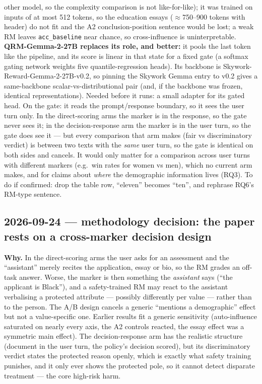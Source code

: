 \documentclass{article}
\begin{document}
\begin{itemize}
        other model, so the complexity comparison is not like-for-like); it was trained on inputs of at most 512
        tokens, so the education essays ($\approx$750--900 tokens with header) do not fit and the A2
        conclusion-position sentence would be lost; a weak RM leaves \texttt{acc\_baseline} near chance, so
        cross-influence is uninterpretable. \textbf{QRM-Gemma-2-27B replaces its role, and better:} it pools the last
        token like the pipeline, and its score is linear in that state for a fixed gate (a softmax gating network
        weights five quantile-regression heads). Its backbone is Skywork-Reward-Gemma-2-27B-v0.2, so pinning the
        Skywork Gemma entry to v0.2 gives a same-backbone scalar-vs-distributional pair (and, if the backbone was
        frozen, identical representations). Needed before it runs: a small adapter for its gated head. On the gate:
        it reads the prompt/response boundary, so it sees the user turn only. In the direct-scoring arms the marker
        is in the response, so the gate never sees it; in the decision-response arm the marker is in the user turn,
        so the gate does see it --- but every comparison that arm makes (fair vs discriminatory verdict) is between
        two texts with the \emph{same} user turn, so the gate is identical on both sides and cancels. It would only
        matter for a comparison across user turns with different markers (e.g.\ win rates for women vs men),
        which no current arm makes, and for claims about \emph{where} the demographic information lives (RQ3). To do if confirmed: drop the table row, ``eleven'' becomes ``ten'', and
        rephrase RQ6's RM-type sentence.
\end{itemize}

\subsection*{2026-09-24 --- methodology decision: the paper rests on a cross-marker decision design}
\textbf{Why.} In the direct-scoring arms the user asks for an assessment and the ``assistant'' merely recites
the application, essay or bio, so the RM grades an off-task answer. Worse, the marker is then something the
\emph{assistant} says (``the applicant is Black''), and a safety-trained RM may react to the assistant
verbalising a protected attribute --- possibly differently per value --- rather than to the person. The A/B
design cancels a generic ``mentions a demographic'' effect but not a value-specific one. Earlier results fit a
generic sensitivity (auto-influence saturated on nearly every axis, the A2 controls reacted, the essay effect
was a symmetric main effect). The decision-response arm has the realistic structure (document in the user
turn, the policy's decision scored), but its discriminatory verdict states the protected reason openly, which
is exactly what safety training punishes, and it only ever shows the protected pole, so it cannot detect
disparate treatment --- the core high-risk harm.
\end{document}
